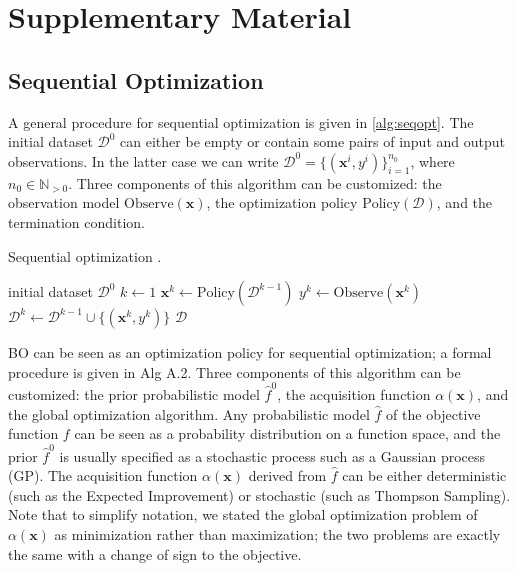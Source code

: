 \documentclass{article}
\begin{document}
\section{Supplementary Material}

\subsection{Sequential Optimization}

A general procedure for sequential optimization is given in \cref{alg:seqopt}. The initial dataset $\mathcal{D}^0$ can either be empty or contain some pairs of input and output observations.
In the latter case we can write $\mathcal{D}^0 = \{(\mathbf{x}^i, y^i)\}_{i=1}^{n_0}$, where
$n_0 \in \mathbb{N}_{>0}$. Three components of this algorithm can be
customized: the observation model $\mathrm{Observe}(\mathbf{x})$, the optimization policy $\mathrm{Policy}(\mathcal{D})$, and the
termination condition.

\begin{algorithm}[ht]
  \caption{Sequential optimization \cite{Garnett2023}.}
  \label{alg:seqopt}
  \begin{algorithmic}[1] %
    \Input initial dataset $\mathcal{D}^0$
    \State $k \gets 1$
     \Repeat
      \State $\mathbf{x}^k \gets \mathrm{Policy}(\mathcal{D}^{k-1})$
      \State $y^k \gets \mathrm{Observe}(\mathbf{x}^k)$ 
      \State $\mathcal{D}^k \gets \mathcal{D}^{k-1} \cup \{(\mathbf{x}^k, y^k)\}$
    \Output  $\mathcal{D}$
  \end{algorithmic}
\end{algorithm}

BO can be seen as an optimization policy for
sequential optimization; a formal procedure is given in Alg A.2. Three
components of this algorithm can be customized: the prior probabilistic
model $\widehat{f}^0$, the acquisition function
$\alpha(\mathbf{x})$, and the global optimization algorithm. Any
probabilistic model $\widehat{f}$ of the objective function $f$ can
be seen as a probability distribution on a function space, and the prior
$\widehat{f}^0$ is usually specified as a stochastic process such as a
Gaussian process (GP). The acquisition function $\alpha(\mathbf{x})$
derived from $\widehat{f}$ can be either deterministic (such as the
Expected Improvement) or stochastic (such as Thompson Sampling). Note
that to simplify notation, we stated the global optimization problem of
$\alpha(\mathbf{x})$ as minimization rather than maximization; the two
problems are exactly the same with a change of sign to the objective.
\end{document}
